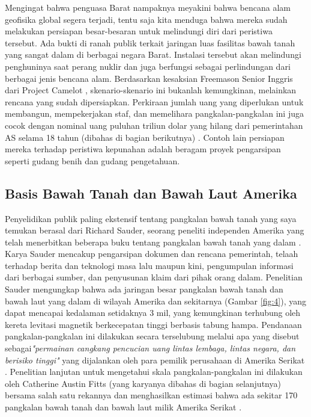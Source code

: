 \documentclass[10pt,twocolumn,letterpaper]{article}
\begin{document}
Mengingat bahwa penguasa Barat nampaknya meyakini bahwa bencana alam geofisika global segera terjadi, tentu saja kita menduga bahwa mereka sudah melakukan persiapan besar-besaran untuk melindungi diri dari peristiwa tersebut. Ada bukti di ranah publik terkait jaringan luas fasilitas bawah tanah yang sangat dalam di berbagai negara Barat. Instalasi tersebut akan melindungi penghuninya saat perang nuklir dan juga berfungsi sebagai perlindungan dari berbagai jenis bencana alam. Berdasarkan kesaksian Freemason Senior Inggris dari Project Camelot \cite{4,6}, skenario-skenario ini bukanlah kemungkinan, melainkan rencana yang sudah dipersiapkan. Perkiraan jumlah uang yang diperlukan untuk membangun, mempekerjakan staf, dan memelihara pangkalan-pangkalan ini juga cocok dengan nominal uang puluhan triliun dolar yang hilang dari pemerintahan AS selama 18 tahun (dibahas di bagian berikutnya) \cite{11,12,13}. Contoh lain persiapan mereka terhadap peristiwa kepunahan adalah beragam proyek pengarsipan seperti gudang benih dan gudang pengetahuan.

\subsection{Basis Bawah Tanah dan Bawah Laut Amerika}

Penyelidikan publik paling ekstensif tentang pangkalan bawah tanah yang saya temukan berasal dari Richard Sauder, seorang peneliti independen Amerika yang telah menerbitkan beberapa buku tentang pangkalan bawah tanah yang dalam \cite{22}. Karya Sauder mencakup pengarsipan dokumen dan rencana pemerintah, telaah terhadap berita dan teknologi masa lalu maupun kini, pengumpulan informasi dari berbagai sumber, dan penyusunan klaim dari pihak orang dalam. Penelitian Sauder mengungkap bahwa ada jaringan besar pangkalan bawah tanah dan bawah laut yang dalam di wilayah Amerika dan sekitarnya (Gambar \ref{fig:4}), yang dapat mencapai kedalaman setidaknya 3 mil, yang kemungkinan terhubung oleh kereta levitasi magnetik berkecepatan tinggi berbasis tabung hampa. Pendanaan pangkalan-pangkalan ini dilakukan secara terselubung melalui apa yang disebut sebagai\textit{"permainan cangkang pencucian uang lintas lembaga, lintas negara, dan berisiko tinggi"} yang dijalankan oleh para pemilik perusahaan di Amerika Serikat \cite{22}. Penelitian lanjutan untuk mengetahui skala pangkalan-pangkalan ini dilakukan oleh Catherine Austin Fitts (yang karyanya dibahas di bagian selanjutnya) bersama salah satu rekannya dan menghasilkan estimasi bahwa ada sekitar 170 pangkalan bawah tanah dan bawah laut milik Amerika Serikat \cite{16,20}.
\end{document}
